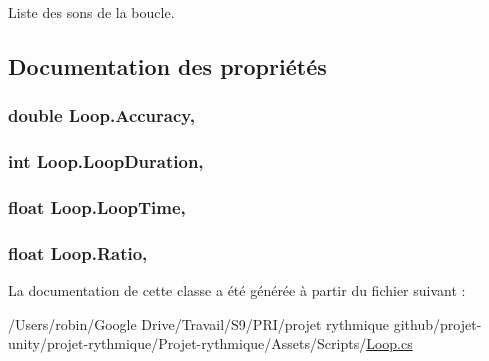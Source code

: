 Liste des sons de la boucle. 



\subsection{Documentation des propriétés}
\hypertarget{class_loop_a7003ed32b3c459138d9c4b5276c5c48d}{}
\subsubsection[{Accuracy}]{\setlength{\rightskip}{0pt plus 5cm}double Loop.\+Accuracy\hspace{0.3cm}{\ttfamily [get]}, {\ttfamily [set]}}\label{class_loop_a7003ed32b3c459138d9c4b5276c5c48d}
\hypertarget{class_loop_a7f64ca10d484fe6b88814fb01d39b193}{}
\subsubsection[{Loop\+Duration}]{\setlength{\rightskip}{0pt plus 5cm}int Loop.\+Loop\+Duration\hspace{0.3cm}{\ttfamily [get]}, {\ttfamily [set]}}\label{class_loop_a7f64ca10d484fe6b88814fb01d39b193}
\hypertarget{class_loop_a6ffef5494771b4e64e3a4976e418860a}{}
\subsubsection[{Loop\+Time}]{\setlength{\rightskip}{0pt plus 5cm}float Loop.\+Loop\+Time\hspace{0.3cm}{\ttfamily [get]}, {\ttfamily [set]}}\label{class_loop_a6ffef5494771b4e64e3a4976e418860a}
\hypertarget{class_loop_a5225d2e331631be4e6613966b967c8aa}{}
\subsubsection[{Ratio}]{\setlength{\rightskip}{0pt plus 5cm}float Loop.\+Ratio\hspace{0.3cm}{\ttfamily [get]}, {\ttfamily [set]}}\label{class_loop_a5225d2e331631be4e6613966b967c8aa}


La documentation de cette classe a été générée à partir du fichier suivant \+:\begin{DoxyCompactItemize}
\item 
/\+Users/robin/\+Google Drive/\+Travail/\+S9/\+P\+R\+I/projet rythmique github/projet-\/unity/projet-\/rythmique/\+Projet-\/rythmique/\+Assets/\+Scripts/\hyperlink{_loop_8cs}{Loop.\+cs}\end{DoxyCompactItemize}
